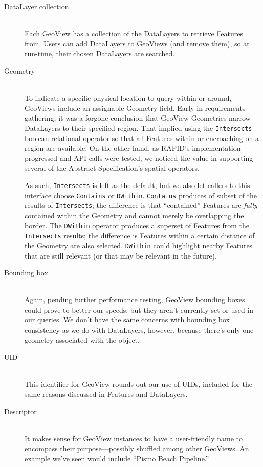 \begin{description}

\item[DataLayer collection] \hfill \\
Each GeoView has a collection of the DataLayers to retrieve Features from. Users can add DataLayers to GeoViews (and remove them), so at run-time, their chosen DataLayers are searched.

\item[Geometry] \hfill \\
To indicate a specific physical location to query within or around, GeoViews include an assignable Geometry field. Early in requirements gathering, it was a forgone conclusion that GeoView Geometries narrow DataLayers to their specified region. That implied using the \texttt{Intersects} boolean relational operator so that all Features within or encroaching on a region are available. On the other hand, as RAPID's implementation progressed and API calls were tested, we noticed the value in supporting several of the Abstract Specification's spatial operators.

As such, \texttt{Intersects} is left as the default, but we also let callers to this interface choose \texttt{Contains} or \texttt{DWithin}. \texttt{Contains} produces of subset of the results of \texttt{Intersects}; the difference is that ``contained'' Features are \textit{fully} contained within the Geometry and cannot merely be overlapping the border. The \texttt{DWithin} operator produces a superset of Features from the \texttt{Intersects} results; the difference is Features within a certain distance of the Geometry are also selected. \texttt{DWithin} could highlight nearby Features that are still relevant (or that may be relevant in the future).

\item[Bounding box] \hfill \\
Again, pending further performance testing, GeoView bounding boxes could prove to better our speeds, but they aren't currently set or used in our queries. We don't have the same concerns with bounding box consistency as we do with DataLayers, however, because there's only one geometry associated with the object.

\item[UID] \hfill \\
This identifier for GeoView rounds out our use of UIDs, included for the same reasons discussed in Features and DataLayers.

\item[Descriptor] \hfill \\
It makes sense for GeoView instances to have a user-friendly name to encompass their purpose---possibly shuffled among other GeoViews. An example we've seen would include ``Pismo Beach Pipeline.''


\end{description}
